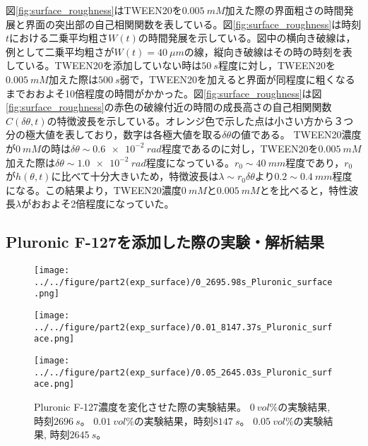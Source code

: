 \documentclass[autodetect-engine,dvi=dvipdfmx,a4paper,ja=standard,oneside,openany,11pt]{bxjsbook}
\begin{document}
図\ref{fig:surface_roughness}はTWEEN20を$\SI{0.005}{mM}$加えた際の界面粗さの時間発展と界面の突出部の自己相関関数を表している。図\ref{fig:surface_roughness}は時刻$t$における二乗平均粗さ$W(t)$の時間発展を示している。図中の横向き破線は，例として二乗平均粗さが$W(t)=\SI{40}{\mu m}$の線，縦向き破線はその時の時刻を表している。TWEEN20を添加していない時は$\SI{50}{s}$程度に対し，TWEEN20を$\SI{0.005}{mM}$加えた際は$\SI{500}{s}$弱で，TWEEN20を加えると界面が同程度に粗くなるまでおおよそ10倍程度の時間がかかった。図\ref{fig:surface_roughness}は図\ref{fig:surface_roughness}の赤色の破線付近の時間の成長高さの自己相関関数$C(\delta\theta,t)$の特徴波長を示している。オレンジ色で示した点は小さい方から３つ分の極大値を表しており，数字は各極大値を取る$\delta \theta$の値である。
TWEEN20濃度が$\SI{0}{mM}$の時は$\delta\theta\sim\SI{0.6e-2}{rad}$程度であるのに対し，TWEEN20を$\SI{0.005}{mM}$加えた際は$\delta\theta\sim\SI{1.0e-2}{rad}$程度になっている。$r_0\sim\SI{40}{mm}$程度であり，$r_0$が$h(\theta,t)$に比べて十分大きいため，特徴波長は$\lambda\sim r_0\delta\theta$より$0.2\sim\SI{0.4}{mm}$程度になる。この結果より，TWEEN20濃度$\SI{0}{mM}$と$\SI{0.005}{mM}$とを比べると，特性波長$\lambda$がおおよそ2倍程度になっていた。

\subsection{Pluronic F-127を添加した際の実験・解析結果}
\begin{figure}[htbp]
  \begin{minipage}
    {0.32\textwidth}
    \subcaption{}
    \centering
    \texttt{[image: ../../figure/part2(exp\_surface)/0\_2695.98s\_Pluronic\_surface.png]}
    \label{fig:0_2695.98 s_Pluronic_surface}
  \end{minipage}
  \begin{minipage}
    {0.32\textwidth}
    \subcaption{}
    \centering
    \texttt{[image: ../../figure/part2(exp\_surface)/0.01\_8147.37s\_Pluronic\_surface.png]}
    \label{fig:0.01_8147.37 s_Pluronic_surface}
  \end{minipage}
  \begin{minipage}
    {0.32\textwidth}
    \subcaption{}
    \centering
    \texttt{[image: ../../figure/part2(exp\_surface)/0.05\_2645.03s\_Pluronic\_surface.png]}
    \label{fig:0.05_2645.03 s_Pluronic_surface}
  \end{minipage}
  \caption{Pluronic F-127濃度を変化させた際の実験結果。 $\SI{0}{vol\%}$の実験結果, 時刻$\SI{2696}{s}$。 $\SI{0.01}{vol\%}$の実験結果，時刻$\SI{8147}{s}$。 $\SI{0.05}{vol\%}$の実験結果, 時刻$\SI{2645}{s}$。}
  \label{fig:Pluronic_surface}
\end{figure}
\end{document}

